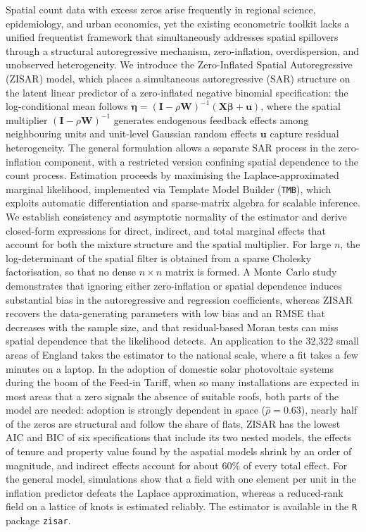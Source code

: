 Spatial count data with excess zeros arise frequently in regional science, epidemiology, and urban economics, yet the existing econometric toolkit lacks a unified frequentist framework that simultaneously addresses spatial spillovers through a structural autoregressive mechanism, zero-inflation, overdispersion, and unobserved heterogeneity.
We introduce the Zero-Inflated Spatial Autoregressive (ZISAR) model, which places a simultaneous autoregressive (SAR) structure on the latent linear predictor of a zero-inflated negative binomial specification: the log-conditional mean follows $\boldsymbol{\eta} = (\mathbf{I} - \rho\mathbf{W})^{-1}(\mathbf{X}\boldsymbol{\beta} + \mathbf{u})$, where the spatial multiplier $(\mathbf{I} - \rho\mathbf{W})^{-1}$ generates endogenous feedback effects among neighbouring units and unit-level Gaussian random effects $\mathbf{u}$ capture residual heterogeneity.
The general formulation allows a separate SAR process in the zero-inflation component, with a restricted version confining spatial dependence to the count process.
Estimation proceeds by maximising the Laplace-approximated marginal likelihood, implemented via Template Model Builder (\texttt{TMB}), which exploits automatic differentiation and sparse-matrix algebra for scalable inference.
We establish consistency and asymptotic normality of the estimator and derive closed-form expressions for direct, indirect, and total marginal effects that account for both the mixture structure and the spatial multiplier.
For large $n$, the log-determinant of the spatial filter is obtained from a sparse Cholesky factorisation, so that no dense $n\times n$ matrix is formed.
A Monte~Carlo study demonstrates that ignoring either zero-inflation or spatial dependence induces substantial bias in the autoregressive and regression coefficients, whereas ZISAR recovers the data-generating parameters with low bias and an RMSE that decreases with the sample size, and that residual-based Moran tests can miss spatial dependence that the likelihood detects.
An application to the 32{,}322 small areas of England takes the estimator to the national scale, where a fit takes a few minutes on a laptop.
In the adoption of domestic solar photovoltaic systems during the boom of the Feed-in Tariff, when so many installations are expected in most areas that a zero signals the absence of suitable roofs, both parts of the model are needed: adoption is strongly dependent in space ($\hat\rho = 0.63$), nearly half of the zeros are structural and follow the share of flats, ZISAR has the lowest AIC and BIC of six specifications that include its two nested models, the effects of tenure and property value found by the aspatial models shrink by an order of magnitude, and indirect effects account for about 60\% of every total effect.
For the general model, simulations show that a field with one element per unit in the inflation predictor defeats the Laplace approximation, whereas a reduced-rank field on a lattice of knots is estimated reliably.
The estimator is available in the \texttt{R} package \texttt{zisar}.
